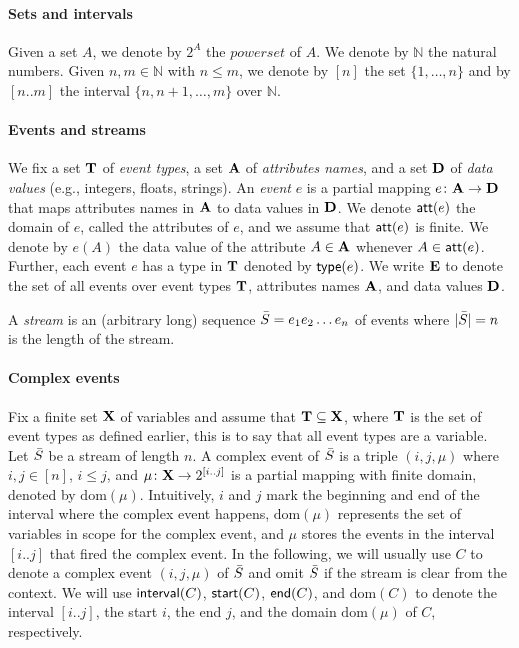 
\paragraph{Sets and intervals} Given a set $A$, we denote by $2^{A}$ the $\textit{powerset}$ of $A$. We denote by $\mathbb{N}$ the natural numbers. Given $n,m \in \mathbb{N}$ with $n \leq m$, we denote by $[n]$ the set $\{1,\dots,n\}$ and by $[n..m]$ the interval $\{n,n+1,\dots,m\}$ over $\mathbb{N}$. 

\paragraph{Events and streams} We fix a set $\mathbf{T}$ of \textit{event types}, a set $\mathbf{A}$ of \textit{attributes names}, and a set $\mathbf{D}$ of \textit{data values} (e.g., integers, floats, strings). An \textit{event} $e$ is a partial mapping $e \colon \mathbf{A} \to \mathbf{D}$ that maps attributes names in $\mathbf{A}$ to data values in $\mathbf{D}$. We denote $\mathsf{att}(e)$ the domain of $e$, called the attributes of $e$, and we assume that $\mathsf{att}(e)$ is finite. We denote by $e(A)$ the data value of the attribute $A \in \mathbf{A}$ whenever $A \in \mathsf{att}(e)$. Further, each event $e$ has a type in $\mathbf{T}$ denoted by $\mathsf{type}(e)$. We write $\mathbf{E}$ to denote the set of all events over event types $\mathbf{T}$, attributes names $\mathbf{A}$, and data values $\mathbf{D}$.

A \textit{stream} is an (arbitrary long) sequence $\bar{S} = e_1 e_2 \dots e_n$ of events where $|\bar{S}| = n$ is the length of the stream.

\paragraph{Complex events} Fix a finite set $\mathbf{X}$ of variables and assume that $\mathbf{T} \subseteq \mathbf{X}$, where $\mathbf{T}$ is the set of event types as defined earlier, this is to say that all event types are a variable. Let $\bar{S}$ be a stream of length $n$. A complex event of $\bar{S}$ is a triple $(i, j, \mu)$ where $i, j \in [n]$, $i \leq j$, and $\mu \colon \mathbf{X} \to 2^{[i..j]}$ is a partial mapping with finite domain, denoted by $\text{dom}(\mu)$. Intuitively, $i$ and $j$ mark the beginning and end of the interval where the complex event happens, $\text{dom}(\mu)$ represents the set of variables in scope for the complex event, and $\mu$ stores the events in the interval $[i..j]$ that fired the complex event. In the following, we will usually use $C$ to denote a complex event $(i, j, \mu)$ of $\bar{S}$ and omit $\bar{S}$ if the stream is clear from the context. We will use $\mathsf{interval}(C)$, $\mathsf{start}(C)$, $\mathsf{end}(C)$, and $\text{dom}(C)$ to denote the interval $[i..j]$, the start $i$, the end $j$, and the domain $\text{dom}(\mu)$ of $C$, respectively.

